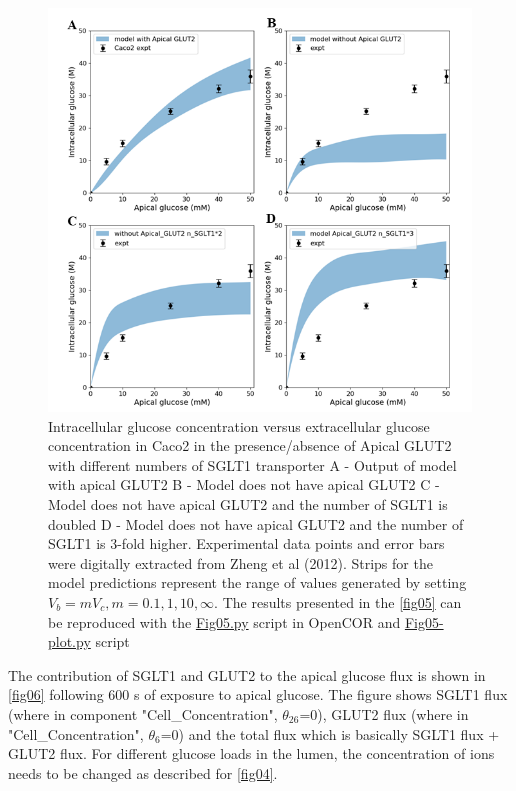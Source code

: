 \documentclass[fleqn,10pt]{physiome}
\begin{document}
\begin{figure}[ht]
\centering
\includegraphics[width=0.8\linewidth]{fig05.png}
\caption{Intracellular glucose concentration versus extracellular glucose concentration in Caco2 in the presence/absence of Apical GLUT2 with different numbers of SGLT1 transporter A - Output of model with apical GLUT2 B - Model does not have apical GLUT2 C - Model does not have apical GLUT2 and the number of SGLT1 is doubled D -  Model does not have apical GLUT2 and the number of SGLT1 is 3-fold higher. Experimental data points and error bars were digitally extracted from Zheng et al (2012). Strips for the model predictions represent the range of values generated by setting $V_b = m V_c, m = 0.1, 1, 10, \infty$. The results presented in the \autoref{fig05} can be reproduced with the \href{https://models.physiomeproject.org/workspace/572/file/c052b0c460280139dad150937fbee4fa6a026505/SEDML_files/Fig05.py}{Fig05.py} script in OpenCOR and \href{https://models.physiomeproject.org/workspace/572/file/c052b0c460280139dad150937fbee4fa6a026505/SEDML_files/Fig05_plot.py}{Fig05-plot.py} script}
\label{fig05}
\end{figure}

The contribution of SGLT1 and GLUT2 to the apical glucose flux is shown in \autoref{fig06} following 600 s of exposure to apical glucose. The figure shows SGLT1 flux (where in component "Cell\_Concentration", {$\theta_{26}$}=0), GLUT2 flux (where in "Cell\_Concentration", {$\theta_{6}$}=0) and the total flux which is basically SGLT1 flux + GLUT2 flux. For different glucose loads in the lumen, the concentration of ions needs to be changed as described for \autoref{fig04}.\newpage
\end{document}
